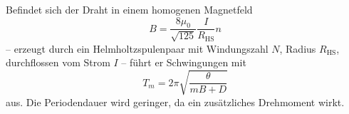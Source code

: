 Befindet sich der Draht in einem homogenen Magnetfeld 
\begin{equation}
B=\frac{8\mu_0}{\sqrt{125}} \frac{I}{R_\mathup{HS}}n
\label{eq:B_HS}
\end{equation}
 -- erzeugt durch ein Helmholtzspulenpaar mit Windungszahl $N$, Radius $R_\mathup{HS}$, durchflossen vom Strom $I$ -- führt er Schwingungen mit 
\begin{equation}
T_m=2\pi\sqrt{\frac{\theta}{mB+D}}
\end{equation}
aus. Die Periodendauer wird geringer, da ein zusätzliches Drehmoment wirkt.


